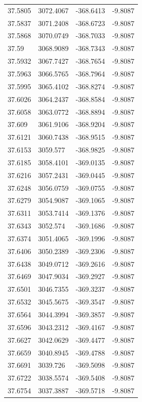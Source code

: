 \begin{table}[H]
\begin{tabular}{llll}
37.5805 & 3072.4067 & -368.6413 & -9.8087 \\
37.5837 & 3071.2408 & -368.6723 & -9.8087 \\
37.5868 & 3070.0749 & -368.7033 & -9.8087 \\
37.59 & 3068.9089 & -368.7343 & -9.8087 \\
37.5932 & 3067.7427 & -368.7654 & -9.8087 \\
37.5963 & 3066.5765 & -368.7964 & -9.8087 \\
37.5995 & 3065.4102 & -368.8274 & -9.8087 \\
37.6026 & 3064.2437 & -368.8584 & -9.8087 \\
37.6058 & 3063.0772 & -368.8894 & -9.8087 \\
37.609 & 3061.9106 & -368.9204 & -9.8087 \\
37.6121 & 3060.7438 & -368.9515 & -9.8087 \\
37.6153 & 3059.577 & -368.9825 & -9.8087 \\
37.6185 & 3058.4101 & -369.0135 & -9.8087 \\
37.6216 & 3057.2431 & -369.0445 & -9.8087 \\
37.6248 & 3056.0759 & -369.0755 & -9.8087 \\
37.6279 & 3054.9087 & -369.1065 & -9.8087 \\
37.6311 & 3053.7414 & -369.1376 & -9.8087 \\
37.6343 & 3052.574 & -369.1686 & -9.8087 \\
37.6374 & 3051.4065 & -369.1996 & -9.8087 \\
37.6406 & 3050.2389 & -369.2306 & -9.8087 \\
37.6438 & 3049.0712 & -369.2616 & -9.8087 \\
37.6469 & 3047.9034 & -369.2927 & -9.8087 \\
37.6501 & 3046.7355 & -369.3237 & -9.8087 \\
37.6532 & 3045.5675 & -369.3547 & -9.8087 \\
37.6564 & 3044.3994 & -369.3857 & -9.8087 \\
37.6596 & 3043.2312 & -369.4167 & -9.8087 \\
37.6627 & 3042.0629 & -369.4477 & -9.8087 \\
37.6659 & 3040.8945 & -369.4788 & -9.8087 \\
37.6691 & 3039.726 & -369.5098 & -9.8087 \\
37.6722 & 3038.5574 & -369.5408 & -9.8087 \\
37.6754 & 3037.3887 & -369.5718 & -9.8087 \\

\end{tabular}
\end{table}
